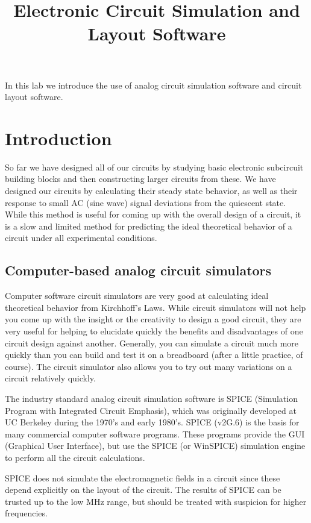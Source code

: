 \documentclass{article}
\title{Electronic Circuit Simulation and Layout Software}
\begin{document}
\maketitle

In this lab we introduce the use of analog circuit simulation software and circuit layout software.

\section{Introduction}
So far we have designed all of our circuits by studying basic electronic subcircuit building blocks and then constructing larger circuits from these. We have designed our circuits by calculating their steady state behavior, as well as their response to small AC (sine wave) signal deviations from the quiescent state. While this method is useful for coming up with the overall design of a circuit, it is a slow and limited method for predicting the ideal theoretical behavior of a circuit under all experimental conditions. 
\subsection{Computer-based analog circuit simulators}
Computer software circuit simulators are very good at calculating ideal theoretical behavior from Kirchhoff's Laws. While circuit simulators will not help you come up with the insight or the creativity to design a good circuit, they are very useful for helping to elucidate quickly the benefits and disadvantages of one circuit design against another. Generally, you can simulate a circuit much more quickly than you can build and test it on a breadboard (after a little practice, of course). The circuit simulator also allows you to try out many variations on a circuit relatively quickly.

The industry standard analog circuit simulation software is SPICE (Simulation Program with Integrated Circuit Emphasis), which was originally developed at UC Berkeley during the 1970's and early 1980's. SPICE (v2G.6) is the basis for many commercial computer software programs. These programs provide the GUI (Graphical User Interface), but use the SPICE (or WinSPICE) simulation engine to perform all the circuit calculations.

SPICE does not simulate the electromagnetic fields in a circuit since these depend explicitly on the layout of the circuit. The results of SPICE can be trusted up to the low MHz range, but should be treated with suspicion for higher frequencies.
\end{document}
